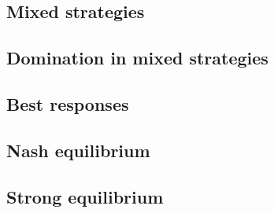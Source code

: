 \subsection{Mixed strategies}
\subsection{Domination in mixed strategies}
\subsection{Best responses}
\subsection{Nash equilibrium}
\subsection{Strong equilibrium}